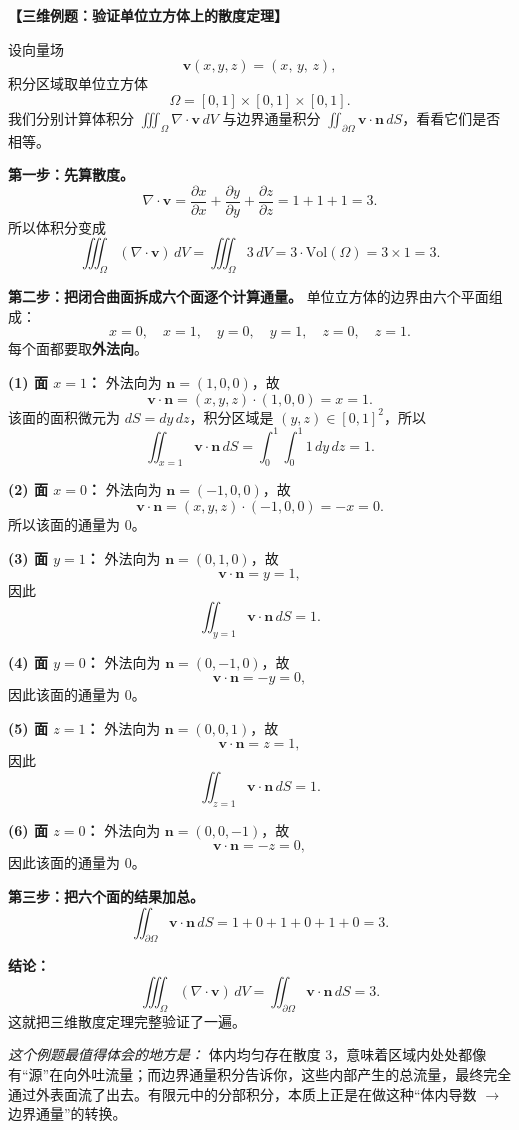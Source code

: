 \documentclass[11pt, a4paper, UTF8]{ctexart}
\begin{document}
\textbf{【三维例题：验证单位立方体上的散度定理】}

设向量场
\[
\bm{v}(x,y,z) = (x,\, y,\, z),
\]
积分区域取单位立方体
\[
\Omega = [0,1]\times[0,1]\times[0,1].
\]
我们分别计算体积分 $\iiint_{\Omega} \nabla\cdot\bm{v}\, dV$ 与边界通量积分 $\iint_{\partial\Omega} \bm{v}\cdot\bm{n}\, dS$，看看它们是否相等。

\textbf{第一步：先算散度。}
\[
\nabla \cdot \bm{v}
=
\frac{\partial x}{\partial x}
+
\frac{\partial y}{\partial y}
+
\frac{\partial z}{\partial z}
= 1+1+1=3.
\]
所以体积分变成
\[
\iiint_{\Omega} (\nabla \cdot \bm{v})\, dV
=
\iiint_{\Omega} 3\, dV
=
3 \cdot \text{Vol}(\Omega)
=
3 \times 1 = 3.
\]

\textbf{第二步：把闭合曲面拆成六个面逐个计算通量。}
单位立方体的边界由六个平面组成：
\[
x=0,\quad x=1,\quad y=0,\quad y=1,\quad z=0,\quad z=1.
\]
每个面都要取\textbf{外法向}。

\textbf{(1) 面 $x=1$：}
外法向为 $\bm{n}=(1,0,0)$，故
\[
\bm{v}\cdot\bm{n} = (x,y,z)\cdot(1,0,0)=x=1.
\]
该面的面积微元为 $dS=dy\,dz$，积分区域是 $(y,z)\in[0,1]^2$，所以
\[
\iint_{x=1} \bm{v}\cdot\bm{n}\, dS
=
\int_0^1\int_0^1 1\, dy\, dz
=1.
\]

\textbf{(2) 面 $x=0$：}
外法向为 $\bm{n}=(-1,0,0)$，故
\[
\bm{v}\cdot\bm{n} = (x,y,z)\cdot(-1,0,0)=-x=0.
\]
所以该面的通量为 0。

\textbf{(3) 面 $y=1$：}
外法向为 $\bm{n}=(0,1,0)$，故
\[
\bm{v}\cdot\bm{n}=y=1,
\]
因此
\[
\iint_{y=1} \bm{v}\cdot\bm{n}\, dS = 1.
\]

\textbf{(4) 面 $y=0$：}
外法向为 $\bm{n}=(0,-1,0)$，故
\[
\bm{v}\cdot\bm{n}=-y=0,
\]
因此该面的通量为 0。

\textbf{(5) 面 $z=1$：}
外法向为 $\bm{n}=(0,0,1)$，故
\[
\bm{v}\cdot\bm{n}=z=1,
\]
因此
\[
\iint_{z=1} \bm{v}\cdot\bm{n}\, dS = 1.
\]

\textbf{(6) 面 $z=0$：}
外法向为 $\bm{n}=(0,0,-1)$，故
\[
\bm{v}\cdot\bm{n}=-z=0,
\]
因此该面的通量为 0。

\textbf{第三步：把六个面的结果加总。}
\[
\iint_{\partial\Omega} \bm{v}\cdot\bm{n}\, dS
=
1+0+1+0+1+0 = 3.
\]

\textbf{结论：}
\[
\iiint_{\Omega} (\nabla\cdot\bm{v})\, dV
=
\iint_{\partial\Omega} \bm{v}\cdot\bm{n}\, dS
=3.
\]
这就把三维散度定理完整验证了一遍。

\textit{这个例题最值得体会的地方是：} 体内均匀存在散度 $3$，意味着区域内处处都像有“源”在向外吐流量；而边界通量积分告诉你，这些内部产生的总流量，最终完全通过外表面流了出去。有限元中的分部积分，本质上正是在做这种“体内导数 $\rightarrow$ 边界通量”的转换。
\end{document}
